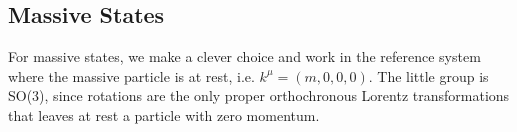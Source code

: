 \documentclass[../main.tex]{subfiles}
\begin{document}
\subsection{Massive States}
For massive states, we make a clever choice and work in the reference system where the massive particle is at rest, i.e. $k^\mu=(m,0,0,0)$. The little group is SO(3), since rotations are the only proper orthochronous Lorentz transformations that leaves at rest a particle with zero momentum. 
\end{document}
